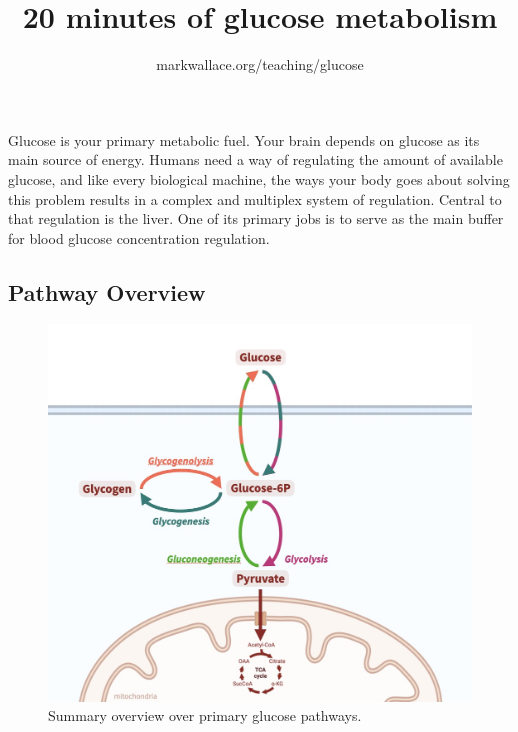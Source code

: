 \documentclass[]{tufte-handout}
\title{20 minutes of glucose metabolism}
\author{markwallace.org/teaching/glucose}
\date{}
\begin{document}
\maketitle


\setlength{\parindent}{0pt}



Glucose is your primary metabolic fuel. Your brain depends on glucose as its main source of energy. Humans need a way of regulating the amount of available glucose, and like every biological machine, the ways your body goes about solving this problem results in a complex and multiplex system of regulation. Central to that regulation is the liver. One of its primary jobs is to serve as the main buffer for blood glucose concentration regulation.

\subsection{Pathway Overview}\label{pathway-overview}

\begin{figure}

{\centering \includegraphics{img/glucose_pathways_summary} 

}

\caption[Summary overview over primary glucose pathways]{Summary overview over primary glucose pathways.}\label{fig:unnamed-chunk-1}
\end{figure}
\end{document}
